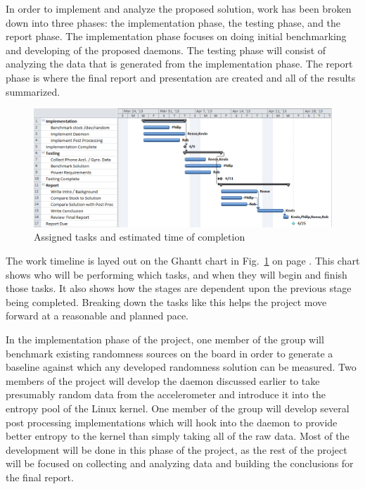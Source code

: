 
In order to implement and analyze the proposed solution, work has been broken
down into three phases: the implementation phase, the testing phase, and the
report phase. The implementation phase focuses on doing initial benchmarking and
developing of the proposed daemons. The testing phase will consist of analyzing
the data that is generated from the implementation phase. The report phase is
where the final report and presentation are created and all of the results
summarized. 

\begin{figure}[ht]
    \centering
    \includegraphics[scale=0.71]{proj-ghantt-v3}
    \caption{Assigned tasks and estimated time of completion}
    \label{fig:gahntt}
\end{figure}

The work timeline is layed out on the Ghantt chart in Fig.~\ref{fig:gahntt} on
page \pageref{fig:gahntt}. This chart shows who will be performing which tasks,
and when they will begin and finish those tasks. It also shows how the stages
are dependent upon the previous stage being completed. Breaking down the tasks
like this helps the project move forward at a reasonable and planned pace.

In the implementation phase of the project, one member of the group will
benchmark existing randomness sources on the board in order to generate a
baseline against which any developed randomness solution can be measured. Two
members of the project will develop the daemon discussed earlier to take
presumably random data from the accelerometer and introduce it into the entropy
pool of the Linux kernel. One member of the group will develop several post
processing implementations which will hook into the daemon to provide better
entropy to the kernel than simply taking all of the raw data. Most of the
development will be done in this phase of the project, as the rest of the
project will be focused on collecting and analyzing data and building the
conclusions for the final report.

